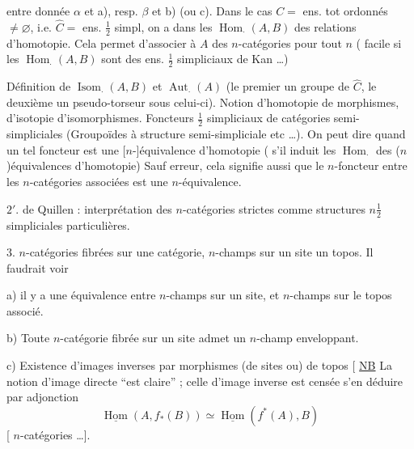entre donnée $\alpha$ et a), resp. $\beta$ et b) (ou c).
Dans le cas $C=$ ens. tot ordonnés $\ne\varnothing$, i.e. $\widehat C=$ ens. $\frac12$ simpl,
on a dans les $\operatorname{Hom}_{\cdot}(A,B)$ des relations d'homotopie.
Cela permet d'associer à $A$ des $n$-catégories pour tout $n$
( facile si les $\operatorname{Hom}_{\cdot}(A,B)$ sont des ens. $\frac12$ simpliciaux
de Kan \ldots)

 Définition de $\operatorname{Isom}_{\cdot}(A,B)$ et $\operatorname{Aut}_{\cdot}(A)$ (le premier
un groupe de $\widehat C$, le deuxième un pseudo-torseur sous
celui-ci). Notion d'homotopie de morphismes, d'isotopie
d'isomorphismes. Foncteurs  $\frac12$ simpliciaux de
catégories  semi-simpliciales  (Groupoïdes à structure
semi-simpliciale etc \ldots). On peut dire quand un
tel foncteur est une [$n$-]équivalence d'homotopie (
s'il induit  les $\operatorname{Hom}_{\cdot}$ des ($n$)équivalences d'homotopie)
Sauf erreur, cela signifie aussi que le $n$-foncteur
entre les $n$-catégories associées est une $n$-équivalence.

$2'$.  de Quillen : interprétation des $n$-catégories
strictes comme structures $n$$\frac12$ simpliciales particulières.

3. $n$-catégories fibrées sur une catégorie, $n$-champs sur
un site un topos.  Il faudrait voir

a) il y a une équivalence entre $n$-champs sur un
site, et $n$-champs sur le topos associé.

b) Toute $n$-catégorie fibrée sur un site admet un
$n$-champ enveloppant.

c) Existence d'images inverses  par morphismes
(de sites ou) de topos [ \uline{NB} La notion d'image directe
``est claire'' ; celle d'image inverse est censée s'en
déduire par  adjonction
\[
\underline{\operatorname{Hom}}(A,f_*(B))\simeq\underline{\operatorname{Hom}}(f^*(A),B)
\]
[  $n$-catégories \ldots].
